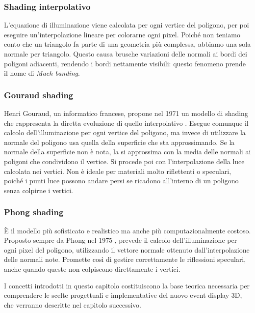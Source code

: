 \subsubsection{Shading interpolativo}
L'equazione di illuminazione viene calcolata per ogni vertice del poligono, per poi eseguire un'interpolazione lineare per colorarne ogni pixel.
Poiché non teniamo conto che un triangolo fa parte di una geometria più complessa, abbiamo una sola normale per triangolo.
Questo causa brusche variazioni delle normali ai bordi dei poligoni adiacenti, rendendo i bordi nettamente visibili: questo fenomeno prende il nome di \emph{Mach banding}.

\subsubsection{Gouraud shading}
Henri Gouraud, un informatico francese, propone nel 1971 un modello di shading che rappresenta la diretta evoluzione di quello interpolativo \cite{Gouraud_1971}.
Esegue comunque il calcolo dell'illuminazione per ogni vertice del poligono, ma invece di utilizzare la normale del poligono usa quella della superficie che sta approssimando.
Se la normale della superficie non è nota, la si approssima con la media delle normali ai poligoni che condividono il vertice.
Si procede poi con l'interpolazione della luce calcolata nei vertici.
Non è ideale per materiali molto riflettenti o speculari, poiché i punti luce possono andare persi se ricadono all'interno di un poligono senza colpirne i vertici.

\subsubsection{Phong shading}
È il modello più sofisticato e realistico ma anche più computazionalmente costoso.
Proposto sempre da Phong nel 1975 \cite{Phong_1975}, prevede il calcolo dell'illuminazione per ogni pixel del poligono, utilizzando il vettore normale ottenuto dall'interpolazione delle normali note.
Promette così di gestire correttamente le riflessioni speculari, anche quando queste non colpiscono direttamente i vertici.

\bigskip
I concetti introdotti in questo capitolo costituiscono la base teorica necessaria per comprendere le scelte progettuali e implementative del nuovo event display 3D, che verranno descritte nel capitolo successivo.